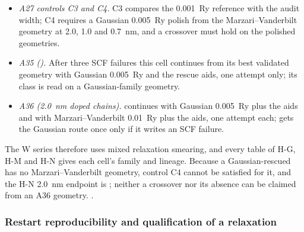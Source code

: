 \begin{itemize}
\item \emph{A27 controls C3 and C4.} C3 compares the 0.001~Ry reference with the audit width; C4 requires a Gaussian
0.005~Ry polish from the Marzari--Vanderbilt geometry at 2.0, 1.0 and \SI{0.7}{nm}, and a crossover must hold on the
polished geometries. %
\item \emph{A35 ().} After three SCF failures this cell continues from its best validated geometry
with Gaussian 0.005~Ry and the rescue aids, one attempt only; its class is read on a Gaussian-family geometry. %
\item \emph{A36 (\SI{2.0}{nm} doped chains).}  continues with Gaussian 0.005~Ry plus the aids and
 with Marzari--Vanderbilt 0.01~Ry plus the aids, one attempt each;  gets
the Gaussian route once only if it writes an SCF failure. %
\end{itemize}
The W series therefore uses mixed relaxation smearing, and every table of H-G, H-M and H-N gives each cell's family
and lineage. %
Because a Gaussian-rescued  has no Marzari--Vanderbilt geometry, control C4 cannot be satisfied for
it, and the H-N \SI{2.0}{nm} endpoint is ; neither a crossover nor its absence can be claimed from an
A36 geometry. %
.

\subsubsection{Restart reproducibility and qualification of a relaxation}
\label{sec:m-dft-restart}

